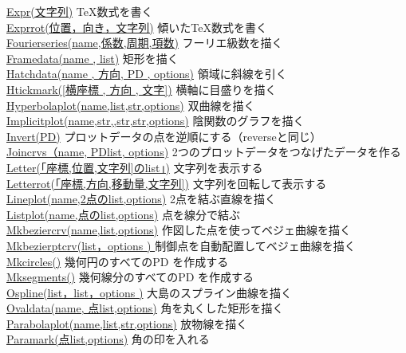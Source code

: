 \documentclass[papersize,a4paper,12pt,uplatex]{jsarticle}
\begin{document}
\begin{tabbing}
\hyperlink{expr}{Expr(文字列)}        \>\TeX 数式を書く\\
\hyperlink{exprrot}{Exprrot(位置，向き，文字列)}        \>傾いた\TeX 数式を書く\\
\hyperlink{fourierseries}{Fourierseries(name,係数,周期,項数)}  \>フーリエ級数を描く\\
\hyperlink{framedata}{Framedata(name , list)}  \>矩形を描く\\
\hyperlink{hatchdata}{Hatchdata(name , 方向, PD , options)}    \>領域に斜線を引く\\
\hyperlink{htickmark}{Htickmark([横座標 , 方向 , 文字])}    \>横軸に目盛りを描く\\
\hyperlink{hyperbolaplot}{Hyperbolaplot(name,list,str,options)}  \>双曲線を描く\\
\hyperlink{implicitplot}{Implicitplot(name,str,,str,str,options)}  \>陰関数のグラフを描く\\
\hyperlink{invert}{Invert(PD)}        \>プロットデータの点を逆順にする（reverseと同じ）\\
\hyperlink{joincrvs}{Joincrvs（name, PDlist, options)}  \>2つのプロットデータをつなげたデータを作る\\
\hyperlink{letter}{Letter(「座標,位置,文字列]のlist」)}      \>文字列を表示する\\
\hyperlink{letterrot}{Letterrot(「座標,方向,移動量,文字列])}      \>文字列を回転して表示する\\
\hyperlink{lineplot}{Lineplot(name,2点のlist,options)}    \>2点を結ぶ直線を描く\\
\hyperlink{listplot}{Listplot(name,点のlist,options)}    \>点を線分で結ぶ\\
\hyperlink{mkbeziercrv}{Mkbeziercrv(name,list,options)}  \>作図した点を使ってベジェ曲線を描く\\
\hyperlink{mkbezierptcrv}{Mkbezierptcrv(list，options ) } \>制御点を自動配置してベジェ曲線を描く\\
\hyperlink{mkcircles}{Mkcircles()}   \>幾何円のすべてのPD を作成する\\
\hyperlink{mksegments}{Mksegments()}  \> 幾何線分のすべてのPD を作成する\\
\hyperlink{ospline}{Ospline(list，list，options )}   \>大島のスプライン曲線を描く\\
\hyperlink{ovaldata}{Ovaldata(name, 点list,options)}    \>角を丸くした矩形を描く\\
\hyperlink{parabolaplot}{Parabolaplot(name,list,str,options)}  \>放物線を描く\\
\hyperlink{paramark}{Paramark(点list,options)}  \>角の印を入れる\\

\end{tabbing}
\end{document}
